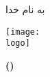 \begin{titlingpage}
\center

به نام خدا
\vspace{5mm}

\ifdefined\logo
\texttt{[image: \\logo]}\\[1cm]
\else
\vspace{6cm}
\fi

\ifdefined\school
{\Large \school}
\fi
\vspace{4cm}

\ifdefined\course
{\Large \course}
\fi
\vspace{1cm}


{\Huge \textbf{ \thetitle \space \ifdefined\hwnumber \tartibinumeral{\hwnumber} \fi}}
\vspace{1cm}

\Large \textbf{\theauthor \ifdefined\studentnumber \space (\studentnumber) \fi}
\vspace{6cm}

\ifdefined\thedate
\thedate
\fi

\end{titlingpage}